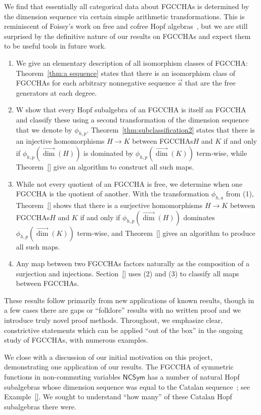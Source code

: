 \documentclass[11pt]{amsart}
\theoremstyle{definition}
\numberwithin{equation}{section}
\newcommand{\FGCCHA}{\textsf{FGCCHA}\xspace}
\newcommand{\FGCCHAs}{\textsf{FGCCHA}s\xspace}
\newcommand{\vecdim}{\overrightarrow{\dim}}
\begin{document}
We find that essentially all categorical data about \FGCCHAs is determined by the dimension sequence via certain simple arithmetic transformations.  
This is reminiscent of Foissy's work on free and cofree Hopf algebras~\cite{F12}, but we are still
surprised by the definitive nature of our results on \FGCCHAs and expect them to be useful tools in future work.
\begin{enumerate}[itemsep = 1ex]
\item We give an elementary description of all isomorphism classes of \FGCCHA:
Theorem~\ref{thm:a sequence} states that there is  an isomorphism class of \FGCCHAs
for each arbitrary nonnegative sequence $\vec{a}$
that are the free generators at each degree.

\item W show that every Hopf subalgebra of an \FGCCHA is itself an \FGCCHA
and classify these using a second transformation of the dimension sequence
that we  denote by $\phi_{h, p}$.  Theorem~\ref{thm:subclassification2} states
that there is an injective homomorphisms $H \to K$ between \FGCCHAs $H$ and $K$
if and only if $\phi_{h, p}(\vecdim(H))$ is dominated by $\phi_{h, p}(\vecdim(K))$
term-wise, while Theorem~\ref{} give an algorithm to construct all such maps.

\item While not every quotient of an \FGCCHA is free, we determine when one \FGCCHA is the quotient of another.  With the transformation $\phi_{h, a}$ from (1), Theorem~\ref{} shows that there is a surjective homomorphisms $H \to K$ between \FGCCHAs $H$ and $K$ if and only if $\phi_{h, p}(\vecdim(H))$ dominates $\phi_{h, p}(\vecdim(K))$ term-wise, and Theorem~\ref{} gives an algorithm to produce all such maps.  

\item Any map between two \FGCCHAs factors naturally as the  composition of a surjection and injections.  Section~\ref{} uses (2) and (3) to classify all maps between \FGCCHAs.

\end{enumerate}
These results follow primarily from new applications of known results, though in a few cases there are gaps or ``folklore'' results with no written proof and we introduce truly novel proof methods.  
Throughout, we emphasize clear, constrictive statements which can be applied ``out of the box'' in the ongoing study of \FGCCHAs, with numerous examples.

We close with a discussion of our initial motivation on this project, demonstrating one application of our results.  
The \FGCCHA of symmetric functions in non-commuting variables $\mathsf{NCSym}$ has a number of natural Hopf subalgebras whose dimension sequence was equal to the Catalan sequence~\cite[A000108]{OEIS}; see Example~\ref{}.  
We sought to understand ``how many'' of these Catalan Hopf subalgebras there were.
\end{document}
